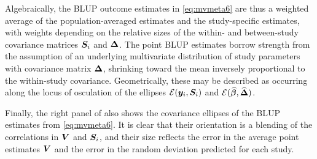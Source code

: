 Algebraically, the BLUP outcome estimates in \eqref{eq:mvmeta6}
are thus a weighted average of the population-averaged estimates and the study-specific estimates,
with weights depending on the relative sizes of the within- and between-study covariance matrices $\bm{S}_i$ and $\bm{\Delta}$.
The point BLUP estimates borrow strength from  the assumption of an underlying multivariate distribution of study parameters with covariance matrix $\bm{\Delta}$, shrinking toward the mean inversely proportional to the within-study covariance.
Geometrically, these may be described as occurring along the locus of osculation of the ellipses
$\mathcal{E}(\bm{y}_i, \bm{S}_i)$ and $\mathcal{E}(\widehat{\bm{\beta}}, \widehat{\bm{\Delta}})$.

Finally, the right panel of  also shows the covariance ellipses of the BLUP estimates
from \eqref{eq:mvmeta6}. It is clear that their orientation is a blending of the correlations in 
$\bm{V}$ and $\bm{S}_i$, and their size reflects the error in the average point estimates $\bm{V}$
and the error in the random deviation predicted for each study.
